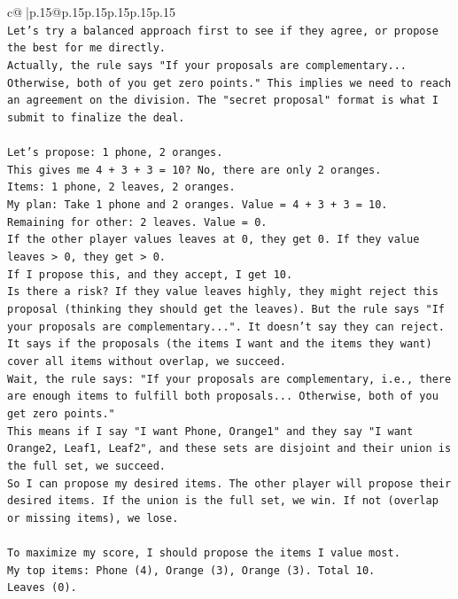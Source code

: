 \documentclass{article}
\begin{document}
{\begin{supertabular}{c@{$\;$}|p{.15\linewidth}@{}p{.15\linewidth}p{.15\linewidth}p{.15\linewidth}p{.15\linewidth}p{.15\linewidth}}
{{{\\ 
\texttt{Let's try a balanced approach first to see if they agree, or propose the best for me directly.} \\
\texttt{Actually, the rule says "If your proposals are complementary... Otherwise, both of you get zero points." This implies we need to reach an agreement on the division. The "secret proposal" format is what I submit to finalize the deal.} \\
\\ 
\texttt{Let's propose: 1 phone, 2 oranges.} \\
\texttt{This gives me 4 + 3 + 3 = 10? No, there are only 2 oranges.} \\
\texttt{Items: 1 phone, 2 leaves, 2 oranges.} \\
\texttt{My plan: Take 1 phone and 2 oranges. Value = 4 + 3 + 3 = 10.} \\
\texttt{Remaining for other: 2 leaves. Value = 0.} \\
\texttt{If the other player values leaves at 0, they get 0. If they value leaves > 0, they get > 0.} \\
\texttt{If I propose this, and they accept, I get 10.} \\
\texttt{Is there a risk? If they value leaves highly, they might reject this proposal (thinking they should get the leaves). But the rule says "If your proposals are complementary...". It doesn't say they can reject. It says if the proposals (the items I want and the items they want) cover all items without overlap, we succeed.} \\
\texttt{Wait, the rule says: "If your proposals are complementary, i.e., there are enough items to fulfill both proposals... Otherwise, both of you get zero points."} \\
\texttt{This means if I say "I want Phone, Orange1" and they say "I want Orange2, Leaf1, Leaf2", and these sets are disjoint and their union is the full set, we succeed.} \\
\texttt{So I can propose my desired items. The other player will propose their desired items. If the union is the full set, we win. If not (overlap or missing items), we lose.} \\
\\ 
\texttt{To maximize my score, I should propose the items I value most.} \\
\texttt{My top items: Phone (4), Orange (3), Orange (3). Total 10.} \\
\texttt{Leaves (0).} \\
}}}
\end{supertabular}}
\end{document}
